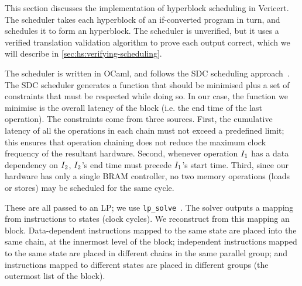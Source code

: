 This section discusses the implementation of hyperblock scheduling in Vericert.
The scheduler takes each hyperblock of an if-converted \rtlblock{} program in
turn, and schedules it to form an \rtlpar{} hyperblock. The scheduler is
unverified, but it uses a verified translation validation algorithm to prove
each output correct, which we will describe in
\cref{sec:hs:verifying-scheduling}.

The scheduler is written in OCaml, and follows the SDC scheduling
approach~\cite{cong06_sdc}.  The SDC scheduler generates a function that should
be minimised plus a set of constraints that must be respected while doing so. In
our case, the function we minimise is the overall latency of the block (i.e. the
end time of the last
operation).
The constraints come from three sources. First, the cumulative latency of all
the operations in each chain must not exceed a predefined limit; this ensures
that operation chaining does not reduce the maximum clock frequency of the
resultant hardware. Second, whenever operation $I_1$ has a data dependency
on $I_2$, $I_2$'s end time must precede $I_1$'s start
time. Third, since our hardware has only a single \gls{BRAM} controller, no two
memory operations (loads or stores) may be scheduled for the same cycle.

These are all passed to an \gls{LP}; we use
\texttt{lp\_solve}~\cite{berkelaar10}.  The solver outputs a mapping from
instructions to states (clock cycles). We reconstruct from this mapping an
\rtlpar{} block. Data-dependent instructions mapped to the same state are placed
into the same chain, at the innermost level of the \rtlpar{} block; independent
instructions mapped to the same state are placed in different chains in the same
parallel group; and instructions mapped to different states are placed in
different groups (the outermost list of the \rtlpar{} block).

